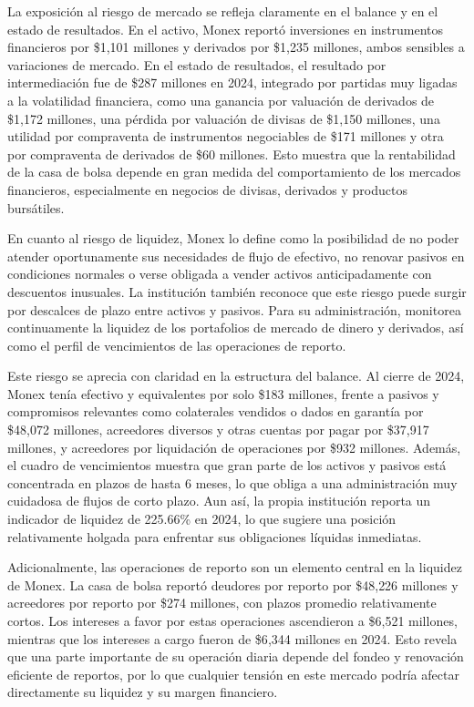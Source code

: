 La exposici\'on al riesgo de mercado se refleja claramente en el balance y en el estado de resultados. En el activo, Monex report\'o inversiones en instrumentos financieros por \$1{,}101 millones y derivados por \$1{,}235 millones, ambos sensibles a variaciones de mercado. En el estado de resultados, el resultado por intermediaci\'on fue de \$287 millones en 2024, integrado por partidas muy ligadas a la volatilidad financiera, como una ganancia por valuaci\'on de derivados de \$1{,}172 millones, una p\'erdida por valuaci\'on de divisas de \$1{,}150 millones, una utilidad por compraventa de instrumentos negociables de \$171 millones y otra por compraventa de derivados de \$60 millones. Esto muestra que la rentabilidad de la casa de bolsa depende en gran medida del comportamiento de los mercados financieros, especialmente en negocios de divisas, derivados y productos burs\'atiles.

En cuanto al riesgo de liquidez, Monex lo define como la posibilidad de no poder atender oportunamente sus necesidades de flujo de efectivo, no renovar pasivos en condiciones normales o verse obligada a vender activos anticipadamente con descuentos inusuales. La instituci\'on tambi\'en reconoce que este riesgo puede surgir por descalces de plazo entre activos y pasivos. Para su administraci\'on, monitorea continuamente la liquidez de los portafolios de mercado de dinero y derivados, as\'i como el perfil de vencimientos de las operaciones de reporto.

Este riesgo se aprecia con claridad en la estructura del balance. Al cierre de 2024, Monex ten\'ia efectivo y equivalentes por solo \$183 millones, frente a pasivos y compromisos relevantes como colaterales vendidos o dados en garant\'ia por \$48{,}072 millones, acreedores diversos y otras cuentas por pagar por \$37{,}917 millones, y acreedores por liquidaci\'on de operaciones por \$932 millones. Adem\'as, el cuadro de vencimientos muestra que gran parte de los activos y pasivos est\'a concentrada en plazos de hasta 6 meses, lo que obliga a una administraci\'on muy cuidadosa de flujos de corto plazo. Aun as\'i, la propia instituci\'on reporta un indicador de liquidez de 225.66\% en 2024, lo que sugiere una posici\'on relativamente holgada para enfrentar sus obligaciones l\'iquidas inmediatas.

Adicionalmente, las operaciones de reporto son un elemento central en la liquidez de Monex. La casa de bolsa report\'o deudores por reporto por \$48{,}226 millones y acreedores por reporto por \$274 millones, con plazos promedio relativamente cortos. Los intereses a favor por estas operaciones ascendieron a \$6{,}521 millones, mientras que los intereses a cargo fueron de \$6{,}344 millones en 2024. Esto revela que una parte importante de su operaci\'on diaria depende del fondeo y renovaci\'on eficiente de reportos, por lo que cualquier tensi\'on en este mercado podr\'ia afectar directamente su liquidez y su margen financiero.

